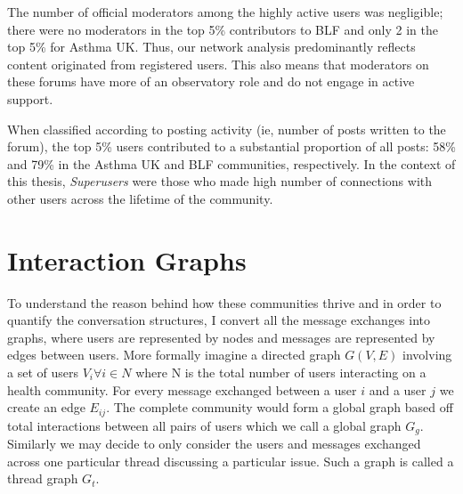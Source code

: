 The number of official moderators among the highly active users was negligible; there were no moderators in the top 5\% contributors to BLF and only 2 in the top 5\% for Asthma UK. Thus, our network analysis predominantly reflects content originated from registered users. This also means that moderators on these forums have more of an observatory role and do not engage in active support. 

When classified according to posting activity (ie, number of posts written to the forum), the top 5\% users contributed to a substantial proportion of all posts: 58\% and 79\% in the Asthma UK and BLF communities, respectively. In the context of this thesis, \textsl{Superusers} were those who made high number of connections with other users across the lifetime of the community.


\section{Interaction Graphs}
\label{sec:graphs}
To understand the reason behind how these communities thrive and in order to quantify the conversation structures, I convert all the message exchanges into graphs, where users are represented by nodes and messages are represented by edges between users. 
More formally imagine a directed graph $G(V,E)$ involving a set of users $V_i\forall i \in N$ where N is the total number of users interacting on a health community. For every message exchanged between a user $i$ and a user $j$ we create an edge $E_{ij}$. The complete community would form a global graph based off total interactions between all pairs of users which we call a global graph $G_g$. Similarly we may decide to only consider the users and messages exchanged across one particular thread discussing a particular issue. Such a graph is called a thread graph $G_t$.

